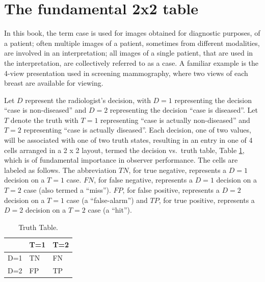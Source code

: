 \documentclass[
]{book}
\begin{document}
\hypertarget{binaryTask0Truth}{%
\section{The fundamental 2x2 table}\label{binaryTask0Truth}}

In this book, the term case is used for images obtained for diagnostic purposes, of a patient; often multiple images of a patient, sometimes from different modalities, are involved in an interpretation; all images of a single patient, that are used in the interpretation, are collectively referred to as a case. A familiar example is the 4-view presentation used in screening mammography, where two views of each breast are available for viewing.

Let \(D\) represent the radiologist's decision, with \(D=1\) representing the decision ``case is non-diseased'' and \(D=2\) representing the decision ``case is diseased''. Let \(T\) denote the truth with \(T=1\) representing ``case is actually non-diseased'' and \(T=2\) representing ``case is actually diseased''. Each decision, one of two values, will be associated with one of two truth states, resulting in an entry in one of 4 cells arranged in a 2 x 2 layout, termed the decision vs.~truth table, Table \ref{tab:binaryTask0truthTable}, which is of fundamental importance in observer performance. The cells are labeled as follows. The abbreviation \(TN\), for true negative, represents a \(D=1\) decision on a \(T=1\) case. \(FN\), for false negative, represents a \(D=1\) decision on a \(T=2\) case (also termed a ``miss''). \(FP\), for false positive, represents a \(D=2\) decision on a \(T=1\) case (a ``false-alarm'') and \(TP\), for true positive, represents a \(D=2\) decision on a \(T=2\) case (a ``hit'').

\begin{table}

\caption{\label{tab:binaryTask0truthTable}Truth Table.}
\centering
\begin{tabular}[t]{l|l|l}
\hline
  & T=1 & T=2\\
\hline
D=1 & TN & FN\\
\hline
D=2 & FP & TP\\
\hline
\end{tabular}
\end{table}
\end{document}
